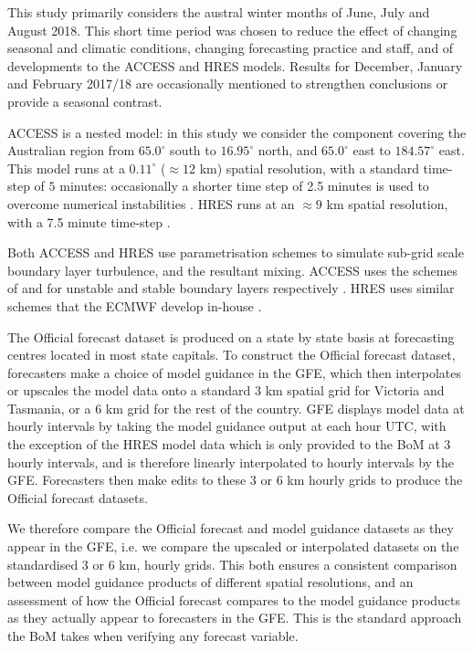 \documentclass[twocol]{ametsoc}
\begin{document}
This study primarily considers the austral winter months of June, July and August 2018. This short time period was chosen to reduce the effect of changing seasonal and climatic conditions, changing forecasting practice and staff, and of developments to the ACCESS and HRES models. Results for December, January and February 2017/18 are occasionally mentioned to strengthen conclusions or provide a seasonal contrast. 

ACCESS is a nested model: in this study we consider the component covering the Australian region from $65.0^\circ$ south to $16.95^\circ$ north, and $65.0^\circ$ east to $184.57^\circ$ east. This model runs at a $0.11^\circ$ ($\approx 12$ km) spatial resolution, with a standard time-step of $5$ minutes: occasionally a shorter time step of 2.5 minutes is used to overcome numerical instabilities \citep{bom16}. HRES runs at an $\approx 9$ km spatial resolution, with a 7.5 minute time-step \citep{ecmwf19c}. 

Both ACCESS and HRES use parametrisation schemes to simulate sub-grid scale boundary layer turbulence, and the resultant mixing. ACCESS uses the schemes of \citet{lock00} and \citet{louis79} for unstable and stable boundary layers respectively \citep{bom10}. HRES uses similar schemes that the ECMWF develop in-house \citep{ecmwf19a}.

The Official forecast dataset is produced on a state by state basis at forecasting centres located in most state capitals. To construct the Official forecast dataset, forecasters make a choice of model guidance in the GFE, which then interpolates or upscales the model data onto a standard 3 km spatial grid for Victoria and Tasmania, or a 6 km grid for the rest of the country. GFE displays model data at hourly intervals by taking the model guidance output at each hour UTC, with the exception of the HRES model data which is only provided to the BoM at 3 hourly intervals, and is therefore linearly interpolated to hourly intervals by the GFE. Forecasters then make edits to these 3 or 6 km hourly grids to produce the Official forecast datasets. 

We therefore compare the Official forecast and model guidance datasets as they appear in the GFE, i.e. we compare the upscaled or interpolated datasets on the standardised 3 or 6 km, hourly grids. This both ensures a consistent comparison between model guidance products of different spatial resolutions, and an assessment of how the Official forecast compares to the model guidance products as they actually appear to forecasters in the GFE. This is the standard approach the BoM takes when verifying any forecast variable.
\end{document}
